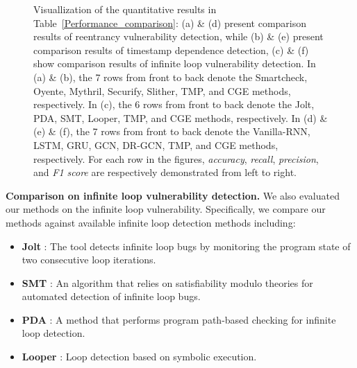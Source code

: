 \begin{figure*}
\centering 
{}
\quad\quad\quad\quad\quad\quad
\quad\quad\quad\quad\quad\quad
{}
\caption{{Visuallization of the quantitative results in Table~\ref{Performance_comparison}: (a) \& (d) present comparison results of reentrancy vulnerability detection, while (b) \& (e) present comparison results of timestamp dependence detection, (c) \& (f) show comparison results of infinite loop vulnerability detection. In (a) \& (b), the 7 rows from front to back denote the Smartcheck, Oyente, Mythril, Securify, Slither, TMP, and CGE methods, respectively. In (c), the 6 rows from front to back denote the Jolt, PDA, SMT, Looper, TMP, and CGE methods, respectively. In (d) \& (e) \& (f), the 7 rows from front to back denote the Vanilla-RNN, LSTM, GRU, GCN, DR-GCN, TMP, and CGE methods, respectively. For each row in the figures, \emph{accuracy}, \emph{recall}, \emph{precision}, and \emph{F1 score} are respectively demonstrated from left to right.}}
\label{3D_fig}
 \vspace{-0.8em}
\end{figure*} 

\textbf{Comparison on infinite loop vulnerability detection.} We also evaluated our methods on the infinite loop vulnerability. Specifically, we compare our methods against available infinite loop detection methods including:
\begin{itemize}[noitemsep,wide=0pt, leftmargin=\dimexpr{} + 2\relax]
	\item \textbf{Jolt} \cite{Jolt}: The tool detects infinite loop bugs by monitoring the program state of two consecutive loop iterations. 
	\item \textbf{SMT} \cite{Smt}: An algorithm that relies on satisfiability modulo theories for automated detection of infinite loop bugs.
	\item \textbf{PDA} \cite{Pda}: A method that performs program path-based checking for infinite loop detection.
	\item \textbf{Looper} \cite{Looper}: Loop detection based on symbolic execution.
\end{itemize}

